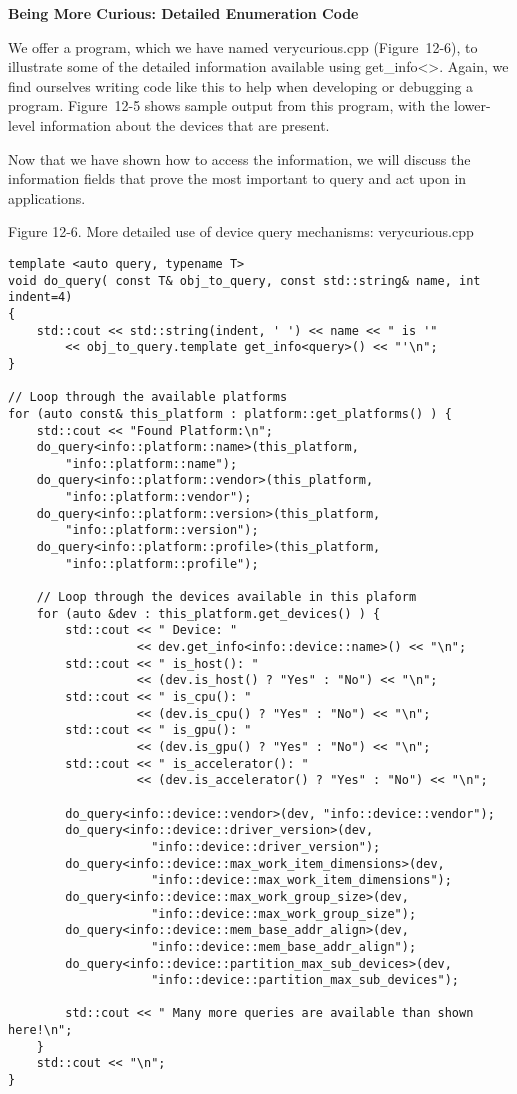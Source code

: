 \hspace*{\fill} \par %
\textbf{Being More Curious: Detailed Enumeration Code}

We offer a program, which we have named verycurious.cpp (Figure 12-6), to illustrate some of the detailed information available using get\_info<>. Again, we find ourselves writing code like this to help when developing or debugging a program. Figure 12-5 shows sample output from this program, with the lower-level information about the devices that are present.\par

Now that we have shown how to access the information, we will discuss the information fields that prove the most important to query and act upon in applications.\par

\hspace*{\fill} \par %
Figure 12-6. More detailed use of device query mechanisms: verycurious.cpp
\begin{lstlisting}[caption={}]
template <auto query, typename T>
void do_query( const T& obj_to_query, const std::string& name, int indent=4) 
{
	std::cout << std::string(indent, ' ') << name << " is '"
		<< obj_to_query.template get_info<query>() << "'\n";
}

// Loop through the available platforms
for (auto const& this_platform : platform::get_platforms() ) {
	std::cout << "Found Platform:\n";
	do_query<info::platform::name>(this_platform,
		"info::platform::name");
	do_query<info::platform::vendor>(this_platform, 
		"info::platform::vendor");
	do_query<info::platform::version>(this_platform, 
		"info::platform::version");
	do_query<info::platform::profile>(this_platform, 
		"info::platform::profile");
		
	// Loop through the devices available in this plaform
	for (auto &dev : this_platform.get_devices() ) {
		std::cout << " Device: "
				  << dev.get_info<info::device::name>() << "\n";
		std::cout << " is_host(): "
				  << (dev.is_host() ? "Yes" : "No") << "\n";
		std::cout << " is_cpu(): "
				  << (dev.is_cpu() ? "Yes" : "No") << "\n";
		std::cout << " is_gpu(): "
			  	  << (dev.is_gpu() ? "Yes" : "No") << "\n";
		std::cout << " is_accelerator(): "
				  << (dev.is_accelerator() ? "Yes" : "No") << "\n";
				  
		do_query<info::device::vendor>(dev, "info::device::vendor");
		do_query<info::device::driver_version>(dev,
					"info::device::driver_version");
		do_query<info::device::max_work_item_dimensions>(dev,
					"info::device::max_work_item_dimensions");
		do_query<info::device::max_work_group_size>(dev,
					"info::device::max_work_group_size");
		do_query<info::device::mem_base_addr_align>(dev,
					"info::device::mem_base_addr_align");
		do_query<info::device::partition_max_sub_devices>(dev,
					"info::device::partition_max_sub_devices");
					
		std::cout << " Many more queries are available than shown here!\n";
	}
	std::cout << "\n";
}
\end{lstlisting}

